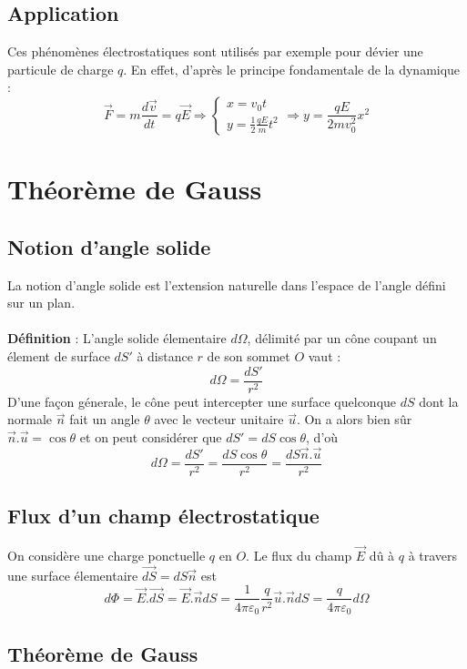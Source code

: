 \subsection{Application}
Ces phénomènes électrostatiques sont utilisés par exemple pour dévier une particule de charge $q$. En effet, d'après le principe fondamentale de la dynamique : 
\[ \vec{F}=m\frac{d\vec{v}}{dt}=q\vec{E}\Rightarrow
\left\{
\begin{array}{l}
x=v_0t\\
y=\frac{1}{2} \frac{qE}{m}t^2
\end{array}
\right. \Rightarrow y=\frac{qE}{2mv_0^2}x^2 \]

\section{Théorème de Gauss}
\subsection{Notion d'angle solide}
La notion d'angle solide est l'extension naturelle dans l'espace de l'angle défini sur un plan. \\\\
\noindent\textbf{Définition} : L'angle solide élementaire $d\Omega$, délimité par un cône coupant un élement de surface $dS'$ à distance $r$ de son sommet $O$ vaut :
\[ d\Omega=\frac{dS'}{r^2} \]
D'une façon génerale, le cône peut intercepter une surface quelconque $dS$ dont la normale $\vec{n}$ fait un angle $\theta$ avec le vecteur unitaire $\vec{u}$. On a alors bien sûr $\vec{n}.\vec{u}=\cos\theta$ et on peut considérer que $dS'=dS\cos\theta$, d'où
\[ d\Omega=\frac{dS'}{r^2}=\frac{dS\cos\theta}{r^2}=\frac{dS\vec{n}.\vec{u}}{r^2} \]

\subsection{Flux d'un champ électrostatique}

On considère une charge ponctuelle $q$ en $O$. Le flux du champ $\vec{E}$ dû à $q$ à travers une surface élementaire $\vec{dS}=dS\vec{n}$ est
\[ d\Phi=\vec{E}.\vec{dS}=\vec{E}.\vec{n}dS=\frac{1}{4\pi\varepsilon_0}\frac{q}{r^2}\vec{u}.\vec{n}dS=\frac{q}{4\pi\varepsilon_0}d\Omega \]

\subsection{Théorème de Gauss}

